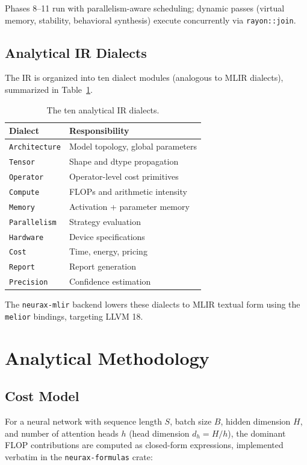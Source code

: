 \documentclass[11pt]{article}
\begin{document}
Phases 8--11 run with parallelism-aware scheduling; dynamic passes (virtual memory, stability, behavioral synthesis) execute concurrently via \texttt{rayon::join}.

\subsection{Analytical IR Dialects}

The IR is organized into ten dialect modules (analogous to MLIR dialects), summarized in Table~\ref{tab:dialects}.

\begin{table}[ht]
\centering
\caption{The ten analytical IR dialects.}
\begin{tabular}{@{}l l@{}}
\toprule
\textbf{Dialect} & \textbf{Responsibility} \\
\midrule
\texttt{Architecture} & Model topology, global parameters \\
\texttt{Tensor} & Shape and dtype propagation \\
\texttt{Operator} & Operator-level cost primitives \\
\texttt{Compute} & FLOPs and arithmetic intensity \\
\texttt{Memory} & Activation + parameter memory \\
\texttt{Parallelism} & Strategy evaluation \\
\texttt{Hardware} & Device specifications \\
\texttt{Cost} & Time, energy, pricing \\
\texttt{Report} & Report generation \\
\texttt{Precision} & Confidence estimation \\
\bottomrule
\end{tabular}
\label{tab:dialects}
\end{table}

The \texttt{neurax-mlir} backend lowers these dialects to MLIR textual form using the \texttt{melior} bindings, targeting LLVM 18.

\section{Analytical Methodology}

\subsection{Cost Model}

For a neural network with sequence length $S$, batch size $B$, hidden dimension $H$, and number of attention heads $h$ (head dimension $d_h = H/h$), the dominant FLOP contributions are computed as closed-form expressions, implemented verbatim in the \texttt{neurax-formulas} crate:
\end{document}
